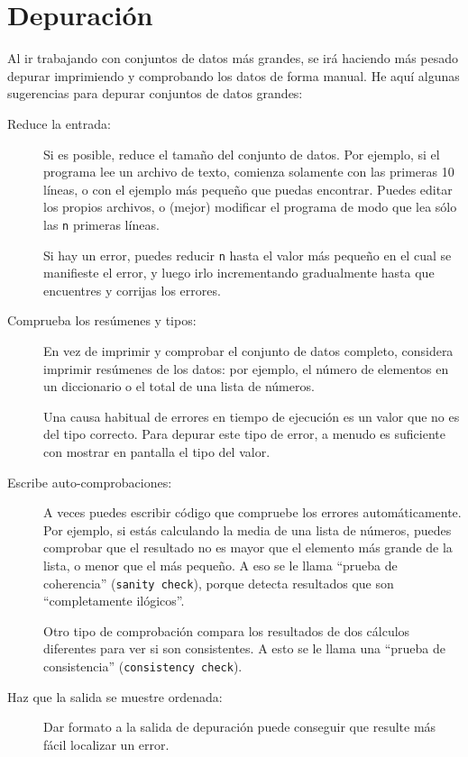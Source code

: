 \section{Depuración}

Al ir trabajando con conjuntos de datos más grandes, se irá haciendo más
pesado depurar imprimiendo y comprobando los datos de forma manual. He aquí algunas
sugerencias para depurar conjuntos de datos grandes:

\begin{description}

\item[Reduce la entrada:] Si es posible, reduce el tamaño del
conjunto de datos. Por ejemplo, si el programa lee un archivo de texto,
comienza solamente con las primeras 10 líneas, o con el ejemplo más pequeño
que puedas encontrar. Puedes editar los propios archivos, o (mejor) modificar el
programa de modo que lea sólo las {\tt n} primeras líneas.

Si hay un error, puedes reducir {\tt n} hasta el valor
más pequeño en el cual se manifieste el error, y luego irlo incrementando gradualmente
hasta que encuentres y corrijas los errores.

\item[Comprueba los resúmenes y tipos:] En vez de imprimir y comprobar el
conjunto de datos completo, considera imprimir resúmenes de los datos: por ejemplo,
el número de elementos en un diccionario o el total de una lista de números.

Una causa habitual de errores en tiempo de ejecución es un valor que no es del tipo
correcto. Para depurar este tipo de error, a menudo es suficiente con mostrar en pantalla
el tipo del valor.

\item[Escribe auto-comprobaciones:] A veces puedes escribir código que compruebe
los errores automáticamente. Por ejemplo, si estás calculando la
media de una lista de números, puedes comprobar que el resultado no
es mayor que el elemento más grande de la lista, o menor que el más
pequeño. A eso se le llama ``prueba de coherencia'' ({\tt sanity check}), porque detecta
resultados que son ``completamente ilógicos''.


Otro tipo de comprobación compara los resultados de dos cálculos
diferentes para ver si son consistentes. A esto se le llama una
``prueba de consistencia'' ({\tt consistency check}).

\item[Haz que la salida se muestre ordenada:] Dar formato a la salida de depuración
puede conseguir que resulte más fácil localizar un error.

\end{description}


